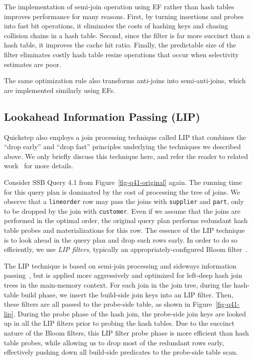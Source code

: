 The implementation of semi-join operation using EF rather than hash tables improves performance for many reasons. First, by turning insertions and probes into fast bit operations, it eliminates the costs of hashing keys and chasing collision chains in a hash table. Second, since the filter is far more succinct than a hash table, it improves the cache hit ratio. Finally, the predictable size of the filter eliminates costly hash table resize operations that occur when selectivity estimates are poor.

The same optimization rule also transforms anti-joins into semi-anti-joins, which are implemented similarly using EFs.

\subsection{Lookahead Information Passing (LIP)} \label{sec:lip}
Quickstep also employs a join processing technique called LIP that combines the ``drop early'' and ``drop fast'' principles underlying the techniques we described above. We only briefly discuss this technique here, and refer the reader to related work~\cite{zhu2017looking} for more details.

Consider SSB Query 4.1 from Figure~\ref{fig-q41-original} again. The running time for this query plan is dominated by the cost of processing the tree of joins. We observe that a \texttt{lineorder} row may pass the joins with \texttt{supplier} and \texttt{part}, only to be dropped by the join with \texttt{customer}. Even if we assume that the joins are performed in the optimal order, the original query plan performs redundant hash table probes and materializations for this row. The essence of the LIP technique is to look ahead in the query plan and drop such rows early. In order to do so efficiently, we use \emph{LIP filters}, typically an appropriately-configured Bloom filter~\cite{Bloom70Space}.

The LIP technique is based on semi-join processing and sideways information passing~\cite{Bernstein1981SemiJoin, Ives2008Sideways, Beeri1987Magic}, but is applied more aggressively and optimized for left-deep hash join trees in the main-memory context. For each join in the join tree, during the hash-table build phase, we insert the build-side join keys into an LIP filter. Then, these filters are all passed to the probe-side table, as shown in Figure~\ref{fig-q41-lip}. During the probe phase of the hash join, the probe-side join keys are looked up in all the LIP filters prior to probing the hash tables. Due to the succinct nature of the Bloom filters, this LIP filter probe phase is more efficient than hash table probes, while allowing us to drop most of the redundant rows early, %
effectively pushing down all build-side predicates to the probe-side table scan.

